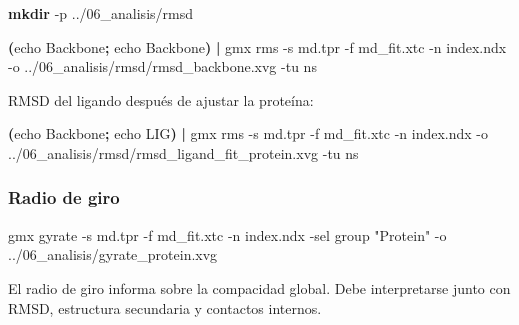 \documentclass[
  spanish,
  11pt,
  a4paper]{article}
\newenvironment{Shaded}{\begin{snugshade}}{\end{snugshade}}
\newcommand{\AttributeTok}[1]{\textcolor[rgb]{0.13,0.29,0.53}{#1}}
\newcommand{\BuiltInTok}[1]{#1}
\newcommand{\ExtensionTok}[1]{#1}
\newcommand{\FunctionTok}[1]{\textcolor[rgb]{0.13,0.29,0.53}{\textbf{#1}}}
\newcommand{\KeywordTok}[1]{\textcolor[rgb]{0.13,0.29,0.53}{\textbf{#1}}}
\newcommand{\NormalTok}[1]{#1}
\newcommand{\StringTok}[1]{\textcolor[rgb]{0.31,0.60,0.02}{#1}}
\begin{document}
\begin{Shaded}
\begin{Highlighting}[]
\FunctionTok{mkdir} \AttributeTok{{-}p}\NormalTok{ ../06\_analisis/rmsd}

\KeywordTok{(}\BuiltInTok{echo}\NormalTok{ Backbone}\KeywordTok{;} \BuiltInTok{echo}\NormalTok{ Backbone}\KeywordTok{)} \KeywordTok{|}
\ExtensionTok{gmx}\NormalTok{ rms     }\AttributeTok{{-}s}\NormalTok{ md.tpr     }\AttributeTok{{-}f}\NormalTok{ md\_fit.xtc     }\AttributeTok{{-}n}\NormalTok{ index.ndx     }\AttributeTok{{-}o}\NormalTok{ ../06\_analisis/rmsd/rmsd\_backbone.xvg     }\AttributeTok{{-}tu}\NormalTok{ ns}
\end{Highlighting}
\end{Shaded}

RMSD del ligando después de ajustar la proteína:

\begin{Shaded}
\begin{Highlighting}[]
\KeywordTok{(}\BuiltInTok{echo}\NormalTok{ Backbone}\KeywordTok{;} \BuiltInTok{echo}\NormalTok{ LIG}\KeywordTok{)} \KeywordTok{|}
\ExtensionTok{gmx}\NormalTok{ rms     }\AttributeTok{{-}s}\NormalTok{ md.tpr     }\AttributeTok{{-}f}\NormalTok{ md\_fit.xtc     }\AttributeTok{{-}n}\NormalTok{ index.ndx     }\AttributeTok{{-}o}\NormalTok{ ../06\_analisis/rmsd/rmsd\_ligand\_fit\_protein.xvg     }\AttributeTok{{-}tu}\NormalTok{ ns}
\end{Highlighting}
\end{Shaded}

\subsubsection{Radio de giro}\label{radio-de-giro}

\begin{Shaded}
\begin{Highlighting}[]
\ExtensionTok{gmx}\NormalTok{ gyrate     }\AttributeTok{{-}s}\NormalTok{ md.tpr     }\AttributeTok{{-}f}\NormalTok{ md\_fit.xtc     }\AttributeTok{{-}n}\NormalTok{ index.ndx     }\AttributeTok{{-}sel} \StringTok{\textquotesingle{}group "Protein"\textquotesingle{}}     \AttributeTok{{-}o}\NormalTok{ ../06\_analisis/gyrate\_protein.xvg}
\end{Highlighting}
\end{Shaded}

El radio de giro informa sobre la compacidad global. Debe interpretarse
junto con RMSD, estructura secundaria y contactos internos.
\end{document}
